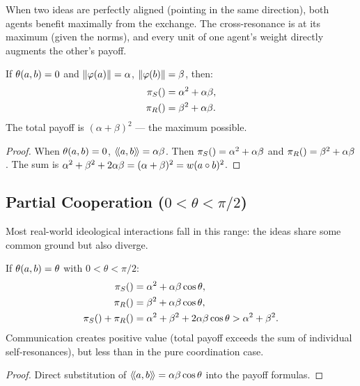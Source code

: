 When two ideas are perfectly aligned (pointing in the same direction), both
agents benefit maximally from the exchange. The cross-resonance is at its
maximum (given the norms), and every unit of one agent's weight directly
augments the other's payoff.

\begin{proposition}
\label{prop:pure-coordination}
If $\theta(a,b) = 0$ and $\lVert \varphi(a) \rVert = \alpha$, $\lVert \varphi(b) \rVert =
\beta$, then:
\begin{align*}
  \pi_{S}() &= \alpha^2 + \alpha\beta, \\
  \pi_{R}() &= \beta^2 + \alpha\beta.
\end{align*}
The total payoff is $(\alpha + \beta)^2$ --- the maximum possible.
\end{proposition}

\begin{proof}
When $\theta(a,b) = 0$, $\langle\!\langle a, b \rangle\!\rangle = \alpha\beta$. Then $\pi_{S}() =
\alpha^2 + \alpha\beta$ and $\pi_{R}() = \beta^2 + \alpha\beta$. The sum
is $\alpha^2 + \beta^2 + 2\alpha\beta = (\alpha + \beta)^2 = w(a \circ
b)^2$.
\end{proof}


\subsection{Partial Cooperation ($0 < \theta < \pi/2$)}

Most real-world ideological interactions fall in this range: the ideas share
some common ground but also diverge.

\begin{proposition}
\label{prop:partial-cooperation}
If $\theta(a,b) = \theta$ with $0 < \theta < \pi/2$:
\begin{align*}
  \pi_{S}() &= \alpha^2 + \alpha\beta\cos\theta, \\
  \pi_{R}() &= \beta^2 + \alpha\beta\cos\theta, \\
  \pi_{S}() + \pi_{R}() &= \alpha^2 + \beta^2 + 2\alpha\beta\cos\theta
  > \alpha^2 + \beta^2.
\end{align*}
Communication creates positive value (total payoff exceeds the sum of individual
self-resonances), but less than in the pure coordination case.
\end{proposition}

\begin{proof}
Direct substitution of $\langle\!\langle a, b \rangle\!\rangle = \alpha\beta\cos\theta$ into the payoff
formulas.
\end{proof}

